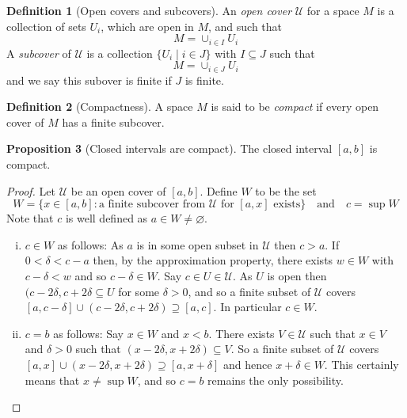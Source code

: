\documentclass[10pt,fleqn]{article}
\theoremstyle{definition} \newtheorem{defn}{Definition}[section]
\theoremstyle{plain}      \newtheorem{thm}[defn]{Theorem}
\theoremstyle{definition} \newtheorem{prop}[defn]{Proposition}
\theoremstyle{definition} \newtheorem{cor}[defn]{Corollary}
\theoremstyle{definition} \newtheorem{ex}[defn]{Example}
\theoremstyle{definition} \newtheorem{rem}[defn]{Remark}
\begin{document}
\begin{defn}[Open covers and subcovers]
    An \emph{open cover} $\mathcal{U}$ for a space $M$ is a collection of sets $U_i$, which are open in $M$, and such that
    \[
        M = \cup_{i\in I}U_i
    \]
    A \emph{subcover} of $\mathcal{U}$ is a collection $\{U_i\mid i\in J\}$ with $I\subseteq J$ such that
    \[
        M = \cup_{i\in J}U_i
    \]
    and we say this subover is finite if $J$ is finite.
\end{defn}

\begin{defn}[Compactness]
    A space $M$ is said to be \emph{compact} if every open cover of $M$ has a finite subcover.
\end{defn}

\begin{prop}[Closed intervals are compact]\label{closed-intervals-compact}
    The closed interval $[a,b]$ is compact.
\end{prop}

\begin{proof}
    Let $\mathcal{U}$ be an open cover of $[a,b]$.
    Define $W$ to be the set
    \[
        W = \{x\in[a,b]\colon\text{a finite subcover from }\mathcal{U}\text{ for }[a,x]\text{ exists}\}\quad
        \text{and}\quad
        c=\sup W
    \]
    Note that $c$ is well defined as $a\in W\neq\varnothing$.
    \begin{enumerate}[(i)]
        \item $c\in W$ as follows:
        As $a$ is in some open subset in $\mathcal{U}$ then $c>a$.
        If $0<\delta<c-a$ then, by the approximation property, there exists $w\in W$ with $c-\delta<w$ and so $c-\delta\in W$.
        Say $c\in U\in\mathcal{U}$.
        As $U$ is open then $(c-2\delta,c+2\delta\subseteq U$ for some $\delta>0$, and so a finite subset of $\mathcal{U}$ covers $[a,c-\delta]\cup(c-2\delta,c+2\delta)\supseteq [a,c]$.
        In particular $c\in W$.
        \item $c=b$ as follows:
        Say $x\in W$ and $x<b$.
        There exists $V\in\mathcal{U}$ such that $x\in V$ and $\delta>0$ such that $(x-2\delta,x+2\delta)\subseteq V$.
        So a finite subset of $\mathcal{U}$ covers $[a,x]\cup(x-2\delta,x+2\delta)\supseteq[a,x+\delta]$
        and hence $x+\delta\in W$.
        This certainly means that $x\neq\sup W$, and so $c=b$ remains the only possibility.
    \end{enumerate}
\end{proof}
\end{document}
